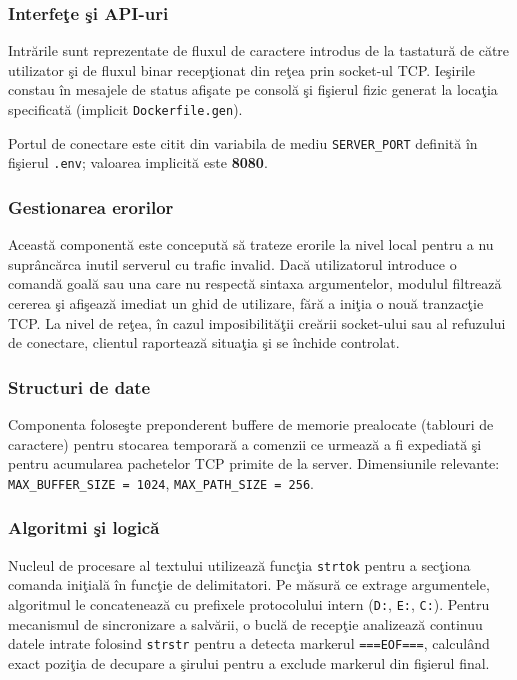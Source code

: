 \documentclass[12pt, a4paper]{article}
\begin{document}
\subsubsection{Interfe\c{t}e \c{s}i API-uri}

Intr\u{a}rile sunt reprezentate de fluxul de caractere introdus de la tastatur\u{a} de c\u{a}tre
utilizator \c{s}i de fluxul binar recep\c{t}ionat din re\c{t}ea prin socket-ul TCP. Ie\c{s}irile
constau \^{i}n mesajele de status afi\c{s}ate pe consol\u{a} \c{s}i fi\c{s}ierul fizic generat la
loca\c{t}ia specificat\u{a} (implicit \texttt{Dockerfile.gen}).

Portul de conectare este citit din variabila de mediu \texttt{SERVER\_PORT} definit\u{a} \^{i}n
fi\c{s}ierul \texttt{.env}; valoarea implicit\u{a} este \textbf{8080}.

\subsubsection{Gestionarea erorilor}

Aceast\u{a} component\u{a} este conceput\u{a} s\u{a} trateze erorile la nivel local pentru a nu
supr\^{a}nc\u{a}rca inutil serverul cu trafic invalid. Dac\u{a} utilizatorul introduce o comand\u{a}
goal\u{a} sau una care nu respect\u{a} sintaxa argumentelor, modulul filtreaz\u{a} cererea \c{s}i
afi\c{s}eaz\u{a} imediat un ghid de utilizare, f\u{a}r\u{a} a ini\c{t}ia o nou\u{a} tranzac\c{t}ie
TCP. La nivel de re\c{t}ea, \^{i}n cazul imposibilit\u{a}\c{t}ii cre\u{a}rii socket-ului sau al
refuzului de conectare, clientul raporteaz\u{a} situa\c{t}ia \c{s}i se \^{i}nchide controlat.

\subsubsection{Structuri de date}

Componenta folose\c{s}te preponderent buffere de memorie prealocate (tablouri de caractere) pentru
stocarea temporar\u{a} a comenzii ce urmeaz\u{a} a fi expediat\u{a} \c{s}i pentru acumularea
pachetelor TCP primite de la server. Dimensiunile relevante: \texttt{MAX\_BUFFER\_SIZE = 1024},
\texttt{MAX\_PATH\_SIZE = 256}.

\subsubsection{Algoritmi \c{s}i logic\u{a}}

Nucleul de procesare al textului utilizeaz\u{a} func\c{t}ia \texttt{strtok} pentru a sec\c{t}iona
comanda ini\c{t}ial\u{a} \^{i}n func\c{t}ie de delimitatori. Pe m\u{a}sur\u{a} ce extrage argumentele,
algoritmul le concateneaz\u{a} cu prefixele protocolului intern (\texttt{D:}, \texttt{E:},
\texttt{C:}). Pentru mecanismul de sincronizare a salv\u{a}rii, o bucl\u{a} de recep\c{t}ie
analizeaz\u{a} continuu datele intrate folosind \texttt{strstr} pentru a detecta markerul
\texttt{===EOF===}, calculând exact pozi\c{t}ia de decupare a \c{s}irului pentru a exclude markerul
din fi\c{s}ierul final.
\end{document}
